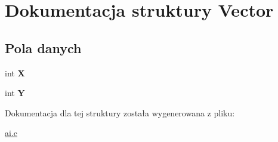 \hypertarget{structVector}{\section{Dokumentacja struktury Vector}
\label{structVector}
}
\subsection*{Pola danych}
\begin{DoxyCompactItemize}
\item 
\hypertarget{structVector_a14f004f4b3693f643b809d09249d09f4}{int {\bfseries X}}\label{structVector_a14f004f4b3693f643b809d09249d09f4}

\item 
\hypertarget{structVector_a159daaacad33412e58223190bead33e2}{int {\bfseries Y}}\label{structVector_a159daaacad33412e58223190bead33e2}

\end{DoxyCompactItemize}


Dokumentacja dla tej struktury została wygenerowana z pliku\-:\begin{DoxyCompactItemize}
\item 
\hyperlink{ai_8c}{ai.\-c}\end{DoxyCompactItemize}
